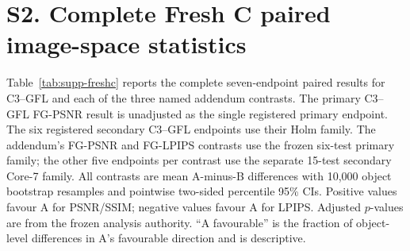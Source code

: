 \documentclass[11pt]{article}
\begin{document}
\section*{S2. Complete Fresh C paired image-space statistics}
Table~\ref{tab:supp-freshc} reports the complete seven-endpoint paired results for C3--GFL and each of the three named addendum contrasts. The primary C3--GFL FG-PSNR result is unadjusted as the single registered primary endpoint. The six registered secondary C3--GFL endpoints use their Holm family. The addendum's FG-PSNR and FG-LPIPS contrasts use the frozen six-test primary family; the other five endpoints per contrast use the separate 15-test secondary Core-7 family. All contrasts are mean A-minus-B differences with 10,000 object bootstrap resamples and pointwise two-sided percentile 95\% CIs. Positive values favour A for PSNR/SSIM; negative values favour A for LPIPS. Adjusted $p$-values are from the frozen analysis authority. “A favourable” is the fraction of object-level differences in A's favourable direction and is descriptive.
\end{document}
